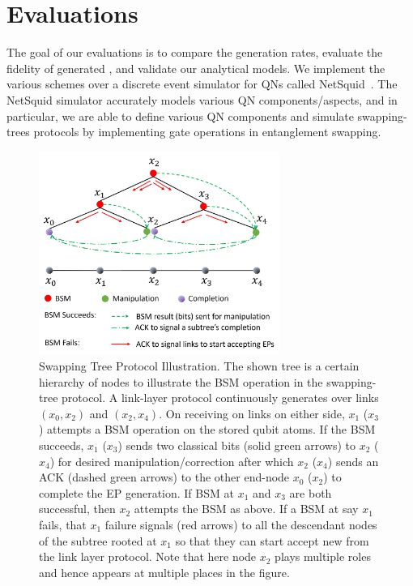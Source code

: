 \section{Evaluations}
\label{sec:swapping_eval}

The goal of our evaluations is to compare the \eps generation rates, evaluate
the fidelity of generated \epss, and validate our analytical models.
We implement the various schemes over a discrete event simulator 
for QNs called NetSquid~\cite{netsquid2020}. 
The NetSquid simulator accurately models various QN components/aspects, and
in particular, we are able to 
define various QN components and simulate swapping-trees protocols
by implementing gate operations in entanglement swapping.  


\begin{figure}[ht]
    \centering
    \includegraphics[width=0.7\textwidth]{chapters/swappingtrees/figures/protocol.jpg}
  \caption{Swapping Tree Protocol Illustration.
  The shown tree is a certain hierarchy of nodes to illustrate the BSM operation in the swapping-tree protocol.  
  A link-layer protocol continuously generates \epss over links $(x_0, x_2)$ and $(x_2, x_4)$.
  On receiving \eps on links on either side, $x_1$ ($x_3$) attempts a BSM operation on the stored
  qubit atoms. If the BSM succeeds, $x_1$ ($x_3$) sends two classical bits (solid green arrows) to  $x_2$ ($x_4$) 
  for desired manipulation/correction after which $x_2$ ($x_4$) sends an ACK (dashed green arrows) to the other end-node $x_0$ ($x_2$) to complete the EP generation. If 
  BSM  at  $x_1$ and $x_3$ are both successful, then $x_2$ attempts the BSM as above. 
  If a BSM at say $x_1$ fails, that $x_1$ failure signals (red arrows) to all the descendant nodes of the subtree
  rooted at $x_1$ so that they can start accept new \epss from the link layer protocol. 
  Note that here node $x_2$ plays multiple roles and hence appears at multiple places in the figure.}
  \label{fig:swapping_protocol}
\end{figure}

